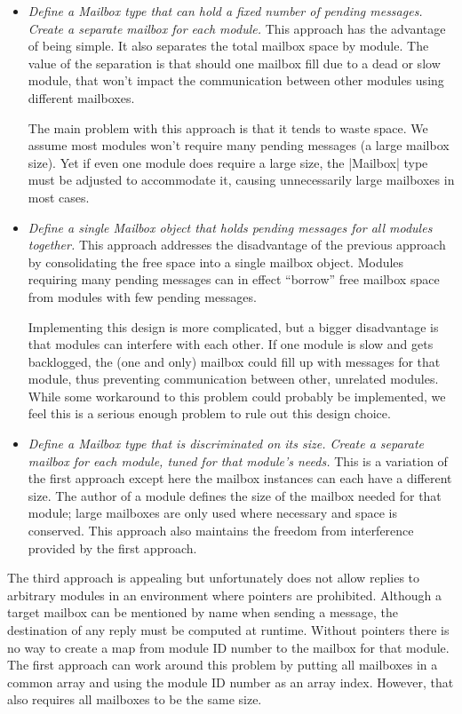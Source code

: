 \begin{itemize}
\item \emph{Define a Mailbox type that can hold a fixed number of pending messages. Create a
  separate mailbox for each module.} This approach has the advantage of being simple. It also
  separates the total mailbox space by module. The value of the separation is that should one
  mailbox fill due to a dead or slow module, that won't impact the communication between other
  modules using different mailboxes.

  The main problem with this approach is that it tends to waste space. We assume most modules
  won't require many pending messages (a large mailbox size). Yet if even one module does
  require a large size, the |Mailbox| type must be adjusted to accommodate it, causing
  unnecessarily large mailboxes in most cases.

\item \emph{Define a single Mailbox object that holds pending messages for all modules
  together.} This approach addresses the disadvantage of the previous approach by consolidating
  the free space into a single mailbox object. Modules requiring many pending messages can in
  effect ``borrow'' free mailbox space from modules with few pending messages.

  Implementing this design is more complicated, but a bigger disadvantage is that modules can
  interfere with each other. If one module is slow and gets backlogged, the (one and only)
  mailbox could fill up with messages for that module, thus preventing communication between
  other, unrelated modules. While some workaround to this problem could probably be implemented,
  we feel this is a serious enough problem to rule out this design choice.

\item \emph{Define a Mailbox type that is discriminated on its size. Create a separate mailbox
  for each module, tuned for that module's needs.} This is a variation of the first approach
  except here the mailbox instances can each have a different size. The author of a module
  defines the size of the mailbox needed for that module; large mailboxes are only used where
  necessary and space is conserved. This approach also maintains the freedom from interference
  provided by the first approach.
\end{itemize}

The third approach is appealing but unfortunately does not allow replies to arbitrary modules in
an environment where pointers are prohibited. Although a target mailbox can be mentioned by name
when sending a message, the destination of any reply must be computed at runtime. Without
pointers there is no way to create a map from module ID number to the mailbox for that module.
The first approach can work around this problem by putting all mailboxes in a common array and
using the module ID number as an array index. However, that also requires all mailboxes to be
the same size.

